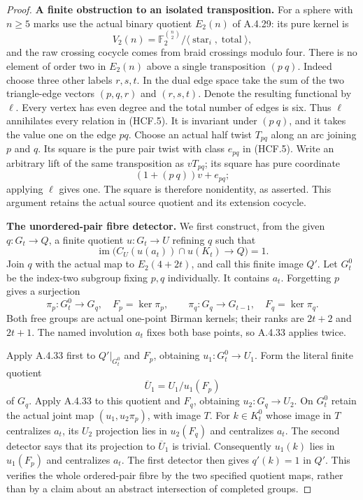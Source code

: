 \begin{proof}
\par\medskip\noindent\textbf{A finite obstruction to an isolated transposition.}\quad
For a sphere with $n\geq5$ marks use the actual binary
quotient $E_2(n)$ of A.4.29: its pure kernel is
\[
 V_2(n)=\mathbb F_2^{\binom n2}/
          \langle\operatorname{star}_i,\operatorname{total}\rangle,
                                                               \tag{HCF.5}
\]
and the raw crossing cocycle comes from braid crossings
modulo four.  There is no element of order two in $E_2(n)$
above a single transposition $(p\ q)$.
Indeed choose three other labels $r,s,t$.  In the dual edge
space take the sum of the two triangle-edge vectors
$(p,q,r)$ and $(r,s,t)$.  Denote the resulting functional
by $\ell$.  Every vertex has even degree and the total
number of edges is six.  Thus $\ell$ annihilates every
relation in (HCF.5).  It is invariant under $(p\ q)$,
and it takes the value one on the edge $pq$.
Choose an actual half twist $T_{pq}$ along an arc joining
$p$ and $q$.  Its square is the pure pair twist with class
$e_{pq}$ in (HCF.5).  Write an arbitrary lift of the same
transposition as $vT_{pq}$; its square has pure coordinate
\[
             (1+(p\ q))v+e_{pq};
\]
applying $\ell$ gives one.  The square is therefore
nonidentity, as asserted.  This argument retains the
actual source quotient and its extension cocycle.

\par\medskip\noindent\textbf{The unordered-pair fibre detector.}\quad
We first construct, from the given $q:G_t\to Q$, a finite
quotient $u:G_t\to U$ refining $q$ such that
\[
 \operatorname{im}\bigl(C_U(u(a_t))\cap u(K_t)
                                     \longrightarrow Q\bigr)=1.
                                                               \tag{HCF.6}
\]
Join $q$ with the actual map to $E_2(4+2t)$, and call this
finite image $Q'$.  Let $G_t^0$ be the index-two subgroup
fixing $p,q$ individually.  It contains $a_t$.
Forgetting $p$ gives a surjection
\[
 \pi_p:G_t^0\longrightarrow G_q,
     \quad F_p=\ker\pi_p,
 \qquad
 \pi_q:G_q\longrightarrow G_{t-1},
     \quad F_q=\ker\pi_q.                              \tag{HCF.7}
\]
Both free groups are actual one-point Birman kernels;
their ranks are $2t+2$ and $2t+1$.  The named involution
$a_t$ fixes both base points, so A.4.33 applies twice.

Apply A.4.33 first to $Q'|_{G_t^0}$ and $F_p$, obtaining
$u_1:G_t^0\to U_1$.  Form the literal finite quotient
\[
                 \overline U_1=U_1/u_1(F_p)
                                                               \tag{HCF.8}
\]
of $G_q$.  Apply A.4.33 to this quotient and $F_q$,
obtaining $u_2:G_q\to U_2$.  On $G_t^0$ retain the actual
joint map $(u_1,u_2\pi_p)$, with image $T$.
For $k\in K_t^0$ whose image in $T$ centralizes $a_t$,
its $U_2$ projection lies in $u_2(F_q)$ and centralizes
$a_t$.  The second detector says that its projection
to $\overline U_1$ is trivial.  Consequently $u_1(k)$
lies in $u_1(F_p)$ and centralizes $a_t$.  The first
detector then gives $q'(k)=1$ in $Q'$.
This verifies the whole ordered-pair fibre by the two
specified quotient maps, rather than by a claim about
an abstract intersection of completed groups.


\end{proof}
